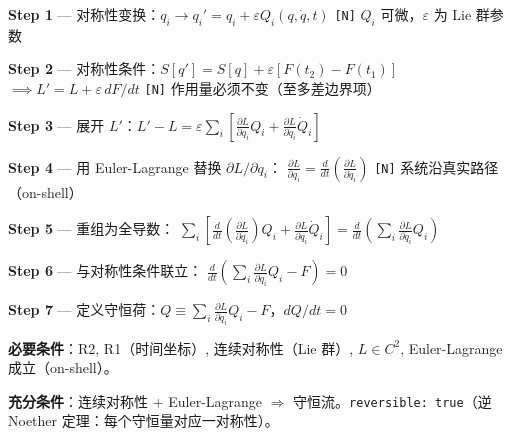 \begin{derivationbox}[推导：Noether 定理]
  \textbf{Step 1} — 对称性变换：$q_i \to q_i' = q_i + \varepsilon Q_i(q,\dot{q},t)$
  \hfill\texttt{[N]} $Q_i$ 可微，$\varepsilon$ 为 Lie 群参数

  \textbf{Step 2} — 对称性条件：$S[q'] = S[q] + \varepsilon[F(t_2)-F(t_1)]$
  $\implies L' = L + \varepsilon\,dF/dt$
  \hfill\texttt{[N]} 作用量必须不变（至多差边界项）

  \textbf{Step 3} — 展开 $L'$：$L' - L = \varepsilon\sum_i[\frac{\partial L}{\partial q_i}Q_i + \frac{\partial L}{\partial\dot{q}_i}\dot{Q}_i]$

  \textbf{Step 4} — 用 Euler-Lagrange 替换 $\partial L/\partial q_i$：
  $\frac{\partial L}{\partial q_i} = \frac{d}{dt}(\frac{\partial L}{\partial\dot{q}_i})$
  \hfill\texttt{[N]} 系统沿真实路径（on-shell）

  \textbf{Step 5} — 重组为全导数：
  $\sum_i[\frac{d}{dt}(\frac{\partial L}{\partial\dot{q}_i})Q_i + \frac{\partial L}{\partial\dot{q}_i}\dot{Q}_i] = \frac{d}{dt}(\sum_i \frac{\partial L}{\partial\dot{q}_i}Q_i)$

  \textbf{Step 6} — 与对称性条件联立：
  $\frac{d}{dt}(\sum_i \frac{\partial L}{\partial\dot{q}_i}Q_i - F) = 0$

  \textbf{Step 7} — 定义守恒荷：$Q \equiv \sum_i \frac{\partial L}{\partial\dot{q}_i}Q_i - F$，$dQ/dt = 0$
\end{derivationbox}

\textbf{必要条件}：R2, R1（时间坐标）, 连续对称性（Lie 群）, $L \in C^2$, Euler-Lagrange 成立（on-shell）。

\textbf{充分条件}：连续对称性 + Euler-Lagrange $\Rightarrow$ 守恒流。\texttt{reversible: true}（逆 Noether 定理：每个守恒量对应一对称性）。



